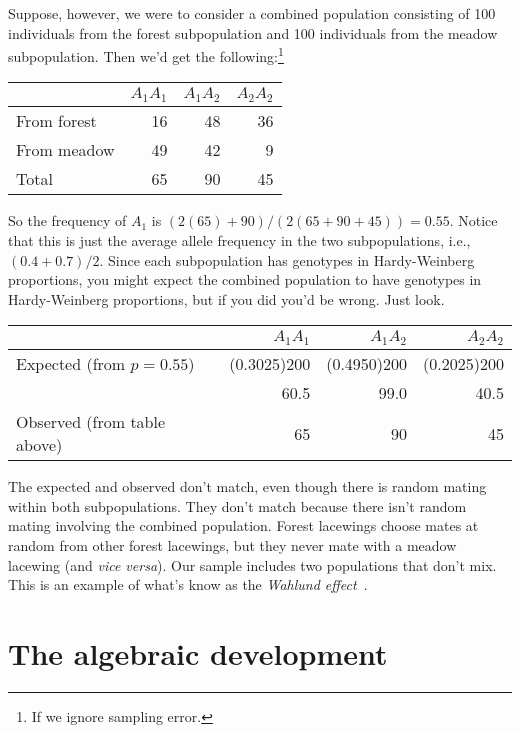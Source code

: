 \documentclass[12pt]{article}
\begin{document}
Suppose, however, we were to consider a combined population consisting
of 100 individuals from the forest subpopulation and 100 individuals
from the meadow subpopulation. Then we'd get the
following:\footnote{If we ignore sampling error.}

\begin{center}
\begin{tabular}{l|rrr}
\hline\hline
       & $A_1A_1$ & $A_1A_2$ & $A_2A_2$ \\
\hline
From forest & 16  & 48       & 36 \\
From meadow & 49  & 42       & 9 \\
\hline
Total       & 65  & 90       & 45 \\
\hline
\end{tabular}
\end{center}
So the frequency of $A_1$ is $(2(65) + 90)/(2(65 + 90 + 45)) =
0.55$. Notice that this is just the average allele frequency in the
two subpopulations, i.e., $(0.4 + 0.7)/2$. Since each subpopulation has
genotypes in Hardy-Weinberg proportions, you might expect the combined
population to have genotypes in Hardy-Weinberg proportions, but if you did
you'd be wrong. Just look.

\begin{center}
\begin{tabular}{l|rrr}
\hline\hline
                            & $A_1A_1$ & $A_1A_2$ & $A_2A_2$ \\
\hline
Expected (from $p=0.55$)    & (0.3025)200 & (0.4950)200 & (0.2025)200 \\
                            & 60.5     & 99.0     & 40.5 \\
Observed (from table above) & 65       & 90       & 45 \\
\hline
\end{tabular}
\end{center}
The expected and observed don't match, even though there is random
mating within both subpopulations. They don't match because there
isn't random mating involving the combined population. Forest
lacewings choose mates at random from other forest lacewings, but they
never mate with a meadow lacewing (and {\it vice versa\/}). Our sample
includes two populations that don't mix. This is an example of what's
know as the {\it Wahlund effect}~\cite{Wahlund-1928}.

\section*{The algebraic development}
\end{document}
